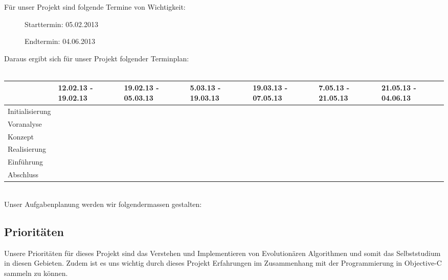 	Für unser Projekt sind folgende Termine von Wichtigkeit:
	\begin{description}
		\item[] Starttermin: 05.02.2013
		\item[] Endtermin: 04.06.2013
	\end{description}
	Daraus ergibt sich für unser Projekt folgender Terminplan:
	\\ \\
	\tiny{
	\begin{tabular}{| p{2cm} | p{1cm} | p{1cm} | p{1cm} | p{1cm} | p{1cm} | p{1cm} |}
	\hline
	\rowcolor[gray]{0.9}  & 12.02.13 - 19.02.13 & 19.02.13 - 05.03.13 & 5.03.13 - 19.03.13 & 19.03.13 - 07.05.13 & 7.05.13 - 21.05.13 & 21.05.13 - 04.06.13 \\
	\hline
	Initialisierung & \cellcolor{yellow} & & & & & \\
	\hline
	Voranalyse & &  \cellcolor{yellow}& & & & \\
	\hline
	Konzept & & &  \cellcolor{yellow}& & & \\
	\hline
	Realisierung & & & &  \cellcolor{yellow}& & \\
	\hline
	Einführung & & & & & \cellcolor{yellow}& \\
	\hline
	Abschluss & & & & &  &\cellcolor{yellow} \\
	\hline
	\end{tabular}	
	}
	\small{
	\\
	Unser Aufgabenplanung werden wir folgendermassen gestalten: 

	\subsection{Prioritäten}
	Unsere Prioritäten für dieses Projekt sind das Verstehen und Implementieren von Evolutionären Algorithmen und somit das Selbststudium in diesen Gebieten. Zudem ist es uns wichtig durch dieses Projekt Erfahrungen im Zusammenhang mit der Programmierung in Objective-C sammeln zu können. 
}